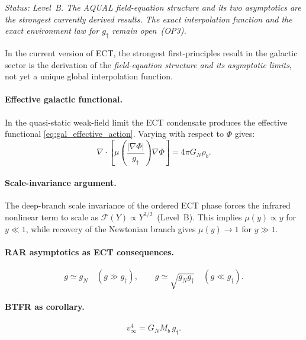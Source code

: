 \documentclass[11pt,a4paper]{article}
\numberwithin{equation}{section}
\begin{document}
\textit{Status: Level~B.  The AQUAL field-equation structure and its
two asymptotics are the strongest currently derived results.  The exact
interpolation function and the exact environment law for $g_\dagger$
remain open~(OP3).}

In the current version of ECT, the strongest first-principles result
in the galactic sector is the derivation of the \emph{field-equation
structure and its asymptotic limits}, not yet a unique global
interpolation function.

\paragraph{Effective galactic functional.}
In the quasi-static weak-field limit the ECT condensate produces the
effective functional \eqref{eq:gal_effective_action}.
Varying with respect to $\Phi$ gives:
\begin{equation}
  \nabla\!\cdot\!\left[
    \mu\!\left(\frac{|\nabla\Phi|}{g_\dagger}\right)\nabla\Phi
  \right]=4\pi G_N\rho_b.
\end{equation}

\paragraph{Scale-invariance argument.}
The deep-branch scale invariance of the ordered ECT phase forces the
infrared nonlinear term to scale as $\mathcal{F}(Y)\propto Y^{3/2}$~(Level~B).
This implies $\mu(y)\propto y$ for $y\ll1$, while recovery of the
Newtonian branch gives $\mu(y)\to1$ for $y\gg1$.

\paragraph{RAR asymptotics as ECT consequences.}
\begin{equation}
  g\simeq g_N \quad(g\gg g_\dagger),\qquad
  g\simeq\sqrt{g_N g_\dagger}\quad(g\ll g_\dagger).
\end{equation}

\paragraph{BTFR as corollary.}
\begin{equation}
  v_\infty^4 = G_N M_b\,g_\dagger.
\end{equation}
\end{document}
